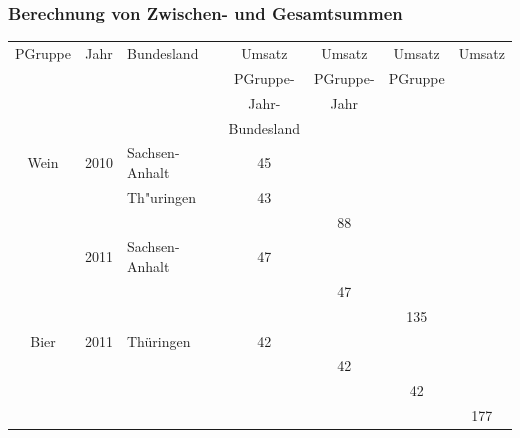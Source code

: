     
    \begin{frame}
    \frametitle{Berechnung von Zwischen- und Gesamtsummen}
    
    
    {\begin{center}\begin{scriptsize}
    \begin{tabular}{|c|c|l|c|c|c|c|}
    \hline
    \rowcolor{Gray} {PGruppe} & {Jahr} & {Bundesland} & {Umsatz} & {Umsatz} & {Umsatz} & {Umsatz} \\
    \rowcolor{Gray}      &      &        & {PGruppe-} & {PGruppe-} &  {PGruppe} & \\
    \rowcolor{Gray}      &      &        & {Jahr-}  & {Jahr}  &  & \\
    \rowcolor{Gray}      &      &        & {Bundesland} &       &  & \\
    \hline\hline
    {Wein} & {2010} & {Sachsen-Anhalt} & {45}    &       &  & \\
            &      & {Th"uringen} & {43}    &       &  & \\
    \hline
            &      &      &        & {88}   &  & \\
    \hline
            & {2011} & {Sachsen-Anhalt} & {47}    &       &  & \\
    \hline
            &      &      &        & {47}   &  & \\
    \hline
            &      &      &        &       & {135}  & \\
    \hline
    {Bier} & {2011} & {Th{\"u}ringen} & {42}    &       &  & \\
    \hline
            &      &      &        & {42}   &  & \\
    \hline
            &      &      &        &       & {42}  & \\
    \hline
            &      &      &        &       &   & {177}\\
    \hline
    \end{tabular}\end{scriptsize}
    \end{center}}

\end{frame}
